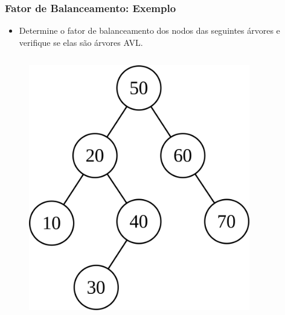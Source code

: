 \documentclass[aspectratio=169]{beamer}
\begin{document}
\begin{frame}\frametitle{Fator de Balanceamento: Exemplo}
\begin{itemize}
	\item Determine o fator de balanceamento dos nodos das seguintes árvores e verifique se elas são árvores AVL.
\end{itemize}
\vspace{-3mm}
\begin{columns}[T]
\begin{column}{0.5\linewidth}
\begin{figure}[h]
	\centering
	\includegraphics[height=0.5\paperheight]{imagens/avl07.png}\\~
\end{figure}
\end{column}
\begin{column}{0.5\linewidth}
\begin{figure}[h]
	\centering

\end{figure}
\end{column}
\end{columns}
\end{frame}
\end{document}

